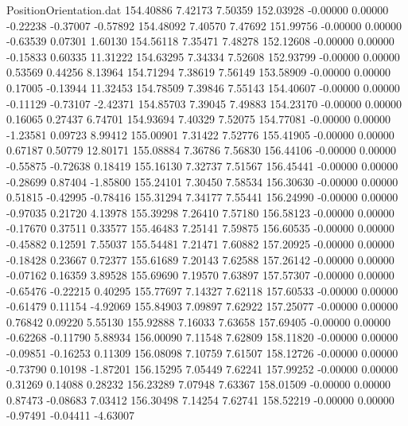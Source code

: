 \begin{filecontents}{PositionOrientation.dat}
 154.40886    7.42173    7.50359   152.03928   -0.00000    0.00000   -0.22238   -0.37007   -0.57892
 154.48092    7.40570    7.47692   151.99756   -0.00000    0.00000   -0.63539    0.07301    1.60130
 154.56118    7.35471    7.48278   152.12608   -0.00000    0.00000   -0.15833    0.60335   11.31222
 154.63295    7.34334    7.52608   152.93799   -0.00000    0.00000    0.53569    0.44256    8.13964
 154.71294    7.38619    7.56149   153.58909   -0.00000    0.00000    0.17005   -0.13944   11.32453
 154.78509    7.39846    7.55143   154.40607   -0.00000    0.00000   -0.11129   -0.73107   -2.42371
 154.85703    7.39045    7.49883   154.23170   -0.00000    0.00000    0.16065    0.27437    6.74701
 154.93694    7.40329    7.52075   154.77081   -0.00000    0.00000   -1.23581    0.09723    8.99412
 155.00901    7.31422    7.52776   155.41905   -0.00000    0.00000    0.67187    0.50779   12.80171
 155.08884    7.36786    7.56830   156.44106   -0.00000    0.00000   -0.55875   -0.72638    0.18419
 155.16130    7.32737    7.51567   156.45441   -0.00000    0.00000   -0.28699    0.87404   -1.85800
 155.24101    7.30450    7.58534   156.30630   -0.00000    0.00000    0.51815   -0.42995   -0.78416
 155.31294    7.34177    7.55441   156.24990   -0.00000    0.00000   -0.97035    0.21720    4.13978
 155.39298    7.26410    7.57180   156.58123   -0.00000    0.00000   -0.17670    0.37511    0.33577
 155.46483    7.25141    7.59875   156.60535   -0.00000    0.00000   -0.45882    0.12591    7.55037
 155.54481    7.21471    7.60882   157.20925   -0.00000    0.00000   -0.18428    0.23667    0.72377
 155.61689    7.20143    7.62588   157.26142   -0.00000    0.00000   -0.07162    0.16359    3.89528
 155.69690    7.19570    7.63897   157.57307   -0.00000    0.00000   -0.65476   -0.22215    0.40295
 155.77697    7.14327    7.62118   157.60533   -0.00000    0.00000   -0.61479    0.11154   -4.92069
 155.84903    7.09897    7.62922   157.25077   -0.00000    0.00000    0.76842    0.09220    5.55130
 155.92888    7.16033    7.63658   157.69405   -0.00000    0.00000   -0.62268   -0.11790    5.88934
 156.00090    7.11548    7.62809   158.11820   -0.00000    0.00000   -0.09851   -0.16253    0.11309
 156.08098    7.10759    7.61507   158.12726   -0.00000    0.00000   -0.73790    0.10198   -1.87201
 156.15295    7.05449    7.62241   157.99252   -0.00000    0.00000    0.31269    0.14088    0.28232
 156.23289    7.07948    7.63367   158.01509   -0.00000    0.00000    0.87473   -0.08683    7.03412
 156.30498    7.14254    7.62741   158.52219   -0.00000    0.00000   -0.97491   -0.04411   -4.63007

\end{filecontents}
